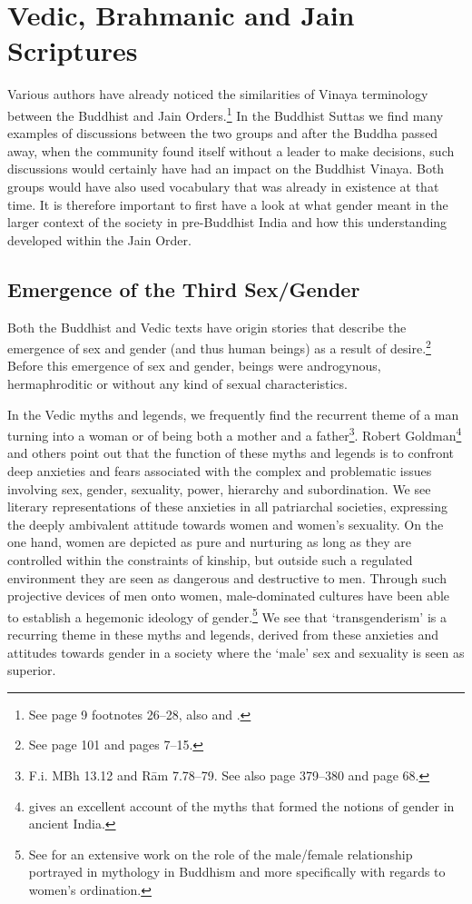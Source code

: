 \section{Vedic, Brahmanic and Jain Scriptures}

Various authors have already noticed the similarities of Vinaya terminology between the Buddhist and Jain Orders.\footnote{See \cite{maes2016} page 9 footnotes 26–28, also \cite{sujato2009} and \cite{zwilling}.} In the Buddhist Suttas we find many examples of discussions between the two groups and after the Buddha passed away, when the community found itself without a leader to make decisions, such discussions would certainly have had an impact on the Buddhist Vinaya. Both groups would have also used vocabulary that was already in existence at that time. It is therefore important to first have a look at what gender meant in the larger context of the society in pre-Buddhist India and how this understanding developed within the Jain Order.

\subsection{Emergence of the Third Sex/Gender}
Both the Buddhist and Vedic texts have origin stories that describe the emergence of sex and gender (and thus human beings) as a result of desire.\footnote{See \cite{zwilling2000} page 101 and \cite{artinger} pages 7–15.} Before this emergence of sex and gender, beings were androgynous, hermaphroditic or without any kind of sexual characteristics.

In the Vedic myths and legends, we frequently find the recurrent theme of a man turning into a woman or of being both a mother and a father\footnote{F.i. MBh 13.12 and Rām 7.78–79. See also \cite{goldman} page 379–380 and \cite{cassell} page 68.}. Robert Goldman\footnote{\cite{goldman} gives an excellent account of the myths that formed the notions of gender in ancient India.} and others point out that the function of these myths and legends is to confront deep anxieties and fears associated with the complex and problematic issues involving sex, gender, sexuality, power, hierarchy and subordination. We see literary representations of these anxieties in all patriarchal societies, expressing the deeply ambivalent attitude towards women and women's sexuality. On the one hand, women are depicted as pure and nurturing as long as they are controlled within the constraints of kinship, but outside such a regulated environment they are seen as dangerous and destructive to men. Through such projective devices of men onto women, male-dominated cultures have been able to establish a hegemonic ideology of gender.\footnote{See \cite{sujato2011} for an extensive work on the role of the male/female relationship portrayed in mythology in Buddhism and more specifically with regards to women's ordination.} We see that `transgenderism' is a recurring theme in these myths and legends, derived from these anxieties and attitudes towards gender in a society where the `male' sex and sexuality is seen as superior.

